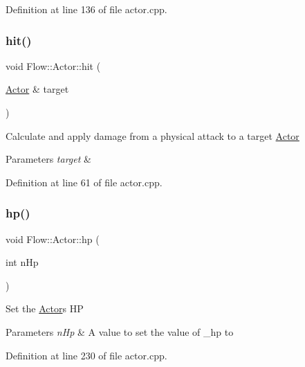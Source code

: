 Definition at line 136 of file actor.\+cpp.

\hypertarget{class_flow_1_1_actor_a8d41b4076822bd8bc03f44119c7546b0}{}\label{class_flow_1_1_actor_a8d41b4076822bd8bc03f44119c7546b0} 
\subsubsection{\texorpdfstring{hit()}{hit()}}
{\footnotesize\ttfamily void Flow\+::\+Actor\+::hit (\begin{DoxyParamCaption}\item[{\hyperlink{class_flow_1_1_actor}{Actor} \&}]{target }\end{DoxyParamCaption})}

Calculate and apply damage from a physical attack to a target \hyperlink{class_flow_1_1_actor}{Actor} 
\begin{DoxyParams}{Parameters}
{\em target} & \\
\hline
\end{DoxyParams}


Definition at line 61 of file actor.\+cpp.

\hypertarget{class_flow_1_1_actor_ab6e6c8f8feb5112cff282769e00f8cc5}{}\label{class_flow_1_1_actor_ab6e6c8f8feb5112cff282769e00f8cc5} 
\subsubsection{\texorpdfstring{hp()}{hp()}\hspace{0.1cm}{\footnotesize\ttfamily [1/3]}}
{\footnotesize\ttfamily void Flow\+::\+Actor\+::hp (\begin{DoxyParamCaption}\item[{int}]{n\+Hp }\end{DoxyParamCaption})}

Set the \hyperlink{class_flow_1_1_actor}{Actor}\textquotesingle{}s HP 
\begin{DoxyParams}{Parameters}
{\em n\+Hp} & A value to set the value of \+\_\+hp to \\
\hline
\end{DoxyParams}


Definition at line 230 of file actor.\+cpp.

\hypertarget{class_flow_1_1_actor_a26d5b782a05e0b8fc8a5d9b3565b97d8}{}\label{class_flow_1_1_actor_a26d5b782a05e0b8fc8a5d9b3565b97d8} 
